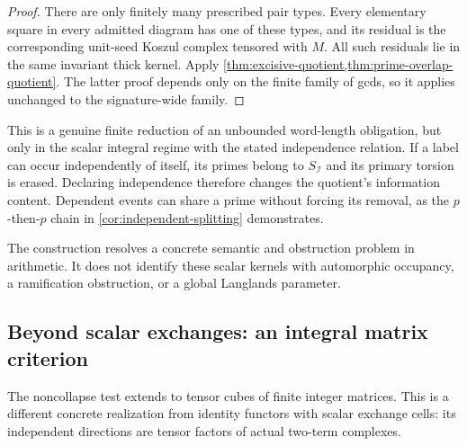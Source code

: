 \documentclass[11pt]{article}
\theoremstyle{definition}
\theoremstyle{remark}
\begin{document}
\begin{proof}
There are only finitely many prescribed pair types. Every elementary square in every admitted diagram has one of these types, and its residual is the corresponding unit-seed Koszul complex tensored with $M$. All such residuals lie in the same invariant thick kernel. Apply \cref{thm:excisive-quotient,thm:prime-overlap-quotient}. The latter proof depends only on the finite family of gcds, so it applies unchanged to the signature-wide family.
\end{proof}

This is a genuine finite reduction of an unbounded word-length obligation, but only in the scalar integral regime with the stated independence relation. If a label can occur independently of itself, its primes belong to $S_{\mathcal I}$ and its primary torsion is erased. Declaring independence therefore changes the quotient's information content. Dependent events can share a prime without forcing its removal, as the $p$-then-$p$ chain in \cref{cor:independent-splitting} demonstrates.

The construction resolves a concrete semantic and obstruction problem in arithmetic. It does not identify these scalar kernels with automorphic occupancy, a ramification obstruction, or a global Langlands parameter.

\subsection{Beyond scalar exchanges: an integral matrix criterion}

The noncollapse test extends to tensor cubes of finite integer matrices. This is a different concrete realization from identity functors with scalar exchange cells: its independent directions are tensor factors of actual two-term complexes.
\end{document}
